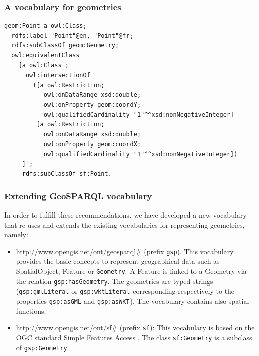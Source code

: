 \subsubsection{A vocabulary for geometries} \label{sec:geomvocab}



\begin{lstlisting}
geom:Point a owl:Class;
  rdfs:label "Point"@en, "Point"@fr;
  rdfs:subClassOf geom:Geometry;
  owl:equivalentClass
    [a owl:Class ;
	  owl:intersectionOf
		([a owl:Restriction;
		   owl:onDataRange xsd:double;
		   owl:onProperty geom:coordY;
	       owl:qualifiedCardinality "1"^^xsd:nonNegativeInteger]
         [a owl:Restriction;
		   owl:onDataRange xsd:double;
		   owl:onProperty geom:coordX;
		   owl:qualifiedCardinality "1"^^xsd:nonNegativeInteger])
     ] ;
     rdfs:subClassOf sf:Point.
\end{lstlisting}

\subsubsection{Extending GeoSPARQL vocabulary}
In order to fulfill these recommendations, we have developed a new vocabulary that re-uses and extends the existing vocabularies for representing geometries, namely:
\begin{itemize}
 \item \url{http://www.opengis.net/ont/geosparql#} (prefix \texttt{gsp}). This vocabulary provides the basic concepts to represent geographical data such as SpatialObject, Feature or \texttt{Geometry}. A Feature is linked to a Geometry via the relation \texttt{gsp:hasGeometry}. The geometries are typed strings (\texttt{gsp:gmlLiteral} or \texttt{gsp:wktLiteral} corresponding respectively to the properties \texttt{gsp:asGML} and \texttt{gsp:asWKT}). The vocabulary contains also spatial functions.
 \item \url{http://www.opengis.net/ont/sf#} (prefix \texttt{sf}): This vocabulary is based on the OGC standard Simple Features Access \cite{iso2004}. The class \texttt{sf:Geometry} is a subclass of \texttt{gsp:Geometry}. 
\end{itemize}
 
